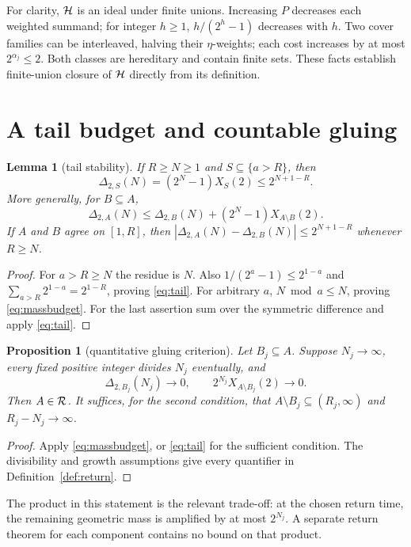 \documentclass[11pt,a4paper]{article}
\newtheorem{proposition}[theorem]{Proposition}
\newtheorem{lemma}[theorem]{Lemma}
\theoremstyle{definition}\newtheorem{definition}[theorem]{Definition}
\theoremstyle{remark}\newtheorem{remark}[theorem]{Remark}
\begin{document}
For clarity, $\mathcal H$ is an ideal under finite unions. Increasing $P$ decreases each weighted summand; for integer $h\ge1$, $h/(2^h-1)$ decreases with $h$. Two cover families can be interleaved, halving their $\eta$-weights; each cost increases by at most $2^{\alpha_j}\le2$. Both classes are hereditary and contain finite sets. These facts establish finite-union closure of $\mathcal H$ directly from its definition.

\section{A tail budget and countable gluing}
\begin{lemma}[tail stability]\label{lem:tail}
If $R\ge N\ge1$ and $S\subseteq\{a>R\}$, then
\begin{equation}\label{eq:tail}
 \Delta_{2,S}(N)=(2^N-1)X_S(2)\le 2^{N+1-R}.
\end{equation}
More generally, for $B\subseteq A$,
\begin{equation}\label{eq:massbudget}
 \Delta_{2,A}(N)\le\Delta_{2,B}(N)+(2^N-1)X_{A\setminus B}(2).
\end{equation}
If $A$ and $B$ agree on $[1,R]$, then
$|\Delta_{2,A}(N)-\Delta_{2,B}(N)|\le2^{N+1-R}$ whenever $R\ge N$.
\end{lemma}
\begin{proof}
For $a>R\ge N$ the residue is $N$. Also
$1/(2^a-1)\le2^{1-a}$ and $\sum_{a>R}2^{1-a}=2^{1-R}$, proving \eqref{eq:tail}.
For arbitrary $a$, $N\bmod a\le N$, proving \eqref{eq:massbudget}.
For the last assertion sum over the symmetric difference and apply \eqref{eq:tail}.
\end{proof}

\begin{proposition}[quantitative gluing criterion]\label{prop:budget}
Let $B_j\subseteq A$. Suppose $N_j\to\infty$, every fixed positive integer divides $N_j$ eventually, and
\[
 \Delta_{2,B_j}(N_j)\to0,\qquad
 2^{N_j}X_{A\setminus B_j}(2)\to0.
\]
Then $A\in\mathcal R$. It suffices, for the second condition, that
$A\setminus B_j\subseteq(R_j,\infty)$ and $R_j-N_j\to\infty$.
\end{proposition}
\begin{proof}
Apply \eqref{eq:massbudget}, or \eqref{eq:tail} for the sufficient condition. The divisibility and growth assumptions give every quantifier in Definition~\ref{def:return}.
\end{proof}
The product in this statement is the relevant trade-off: at the chosen return time, the remaining geometric mass is amplified by at most $2^{N_j}$.
A separate return theorem for each component contains no bound on that product.
\end{document}
